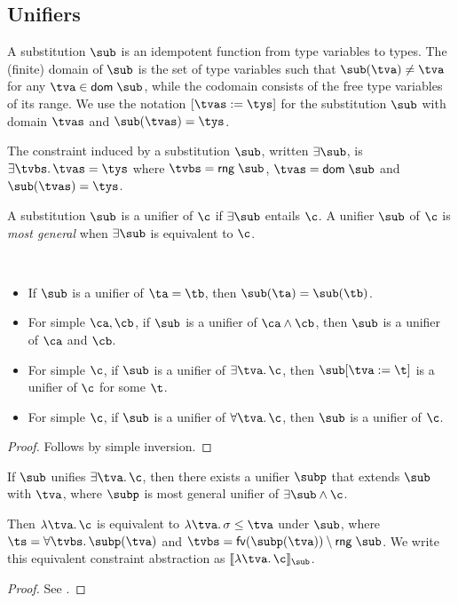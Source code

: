 \documentclass[acmsmall,screen,nonacm%
\Anonymous{,anonymous}{}%
\Final{}{,review}%
]{acmart}
\newcommand{\BBemlti}{Pottier-Remy/emlti}
\begin{document}
\subsection{Unifiers}

A substitution $\sub$ is an idempotent function from type variables to types.
The (finite) domain of $\sub$ is the set of type variables such that $\sub(\tv)
\neq \tv$ for any $\tv \in \dom \sub$, while the codomain consists of the free
type variables of its range.
%
We use the notation $\where{\tvs \is \tys}$ for the substitution $\sub$ with
domain $\tvs$ and $\sub(\tvs) = \tys$.

The constraint induced by a substitution $\sub$, written $\exists \sub$, is
$\cexists {\tvbs} \tvs = \tys$ where $\tvbs = \rng \sub$, $\tvs = \dom \sub$
and $\sub(\tvs) = \tys$.

\begin{definition}[Unifier]
  A substitution $\sub$ is a unifier of $\c$ if $\exists \sub$ entails $\c$.
  A unifier $\sub$ of $\c$ is \emph{most general} when $\exists \sub$ is equivalent
  to $\c$.
\end{definition}

\begin{lemma}
  \label{lem:unifier-simple-inversion}
  ~
  \begin{itemize}
    \item If $\sub$ is a unifier of $\cunif \ta \tb$, then $\sub(\ta) = \sub(\tb)$.
    \item For simple $\ca, \cb$, if $\sub$ is a unifier of $\ca \cand \cb$, then $\sub$ is a unifier of $\ca$ and $\cb$.
    \item For simple $\c$, if $\sub$ is a unifier of $\cexists \tv \c$, then $\sub\where{\tv \is \t}$ is a unifier of $\c$ for some $\t$.
    \item For simple $\c$, if $\sub$ is a unifier of $\cfor \tv \c$, then $\sub$ is a unifier of $\c$.
  \end{itemize}
  \begin{proof}
    Follows by simple inversion.
  \end{proof}
\end{lemma}

\begin{lemma}
  \label{lem:unifier-abs-equiv}
  If $\sub$ unifies $\cexists \tv \c$, then there exists a unifier $\subp$ that extends $\sub$ with $\tv$,
  where $\subp$ is most general unifier of $\exists \sub \cand \c$.


  Then $\cabs \tv \c$ is equivalent to $\cabs \tv \sigma \leq \tv$ under $\sub$, where $\ts = \tfor \tvbs \subp(\tv)$ and
  $\tvbs = \fvs {\subp(\tv)} \setminus \rng \sub$. We write this equivalent constraint abstraction as $\csem {\cabs \tv \c}_\sub$.
  \begin{proof}
    See \citet*{\BBemlti}.
  \end{proof}
\end{lemma}
\end{document}
